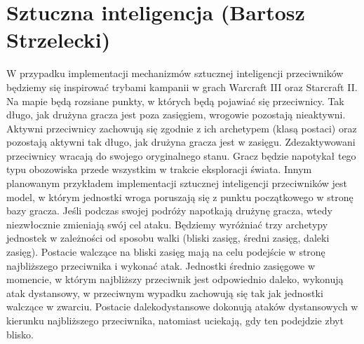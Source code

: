 \section{Sztuczna inteligencja (Bartosz Strzelecki)}

W przypadku implementacji mechanizmów sztucznej inteligencji przeciwników będziemy się inspirować trybami kampanii w grach Warcraft III oraz Starcraft II. 
Na mapie będą rozsiane punkty, w których będą pojawiać się przeciwnicy. 
Tak długo, jak drużyna gracza jest poza zasięgiem, wrogowie pozostają nieaktywni. 
Aktywni przeciwnicy zachowują się zgodnie z ich archetypem (klasą postaci) oraz pozostają aktywni tak długo, jak drużyna gracza jest w zasięgu. 
Zdezaktywowani przeciwnicy wracają do swojego oryginalnego stanu. Gracz będzie napotykał tego typu obozowiska przede wszystkim w trakcie eksploracji świata. 
Innym planowanym przykładem implementacji sztucznej inteligencji przeciwników jest model, w którym jednostki wroga poruszają się z punktu początkowego w stronę bazy gracza. 
Jeśli podczas swojej podróży napotkają drużynę gracza, wtedy niezwłocznie zmieniają swój cel ataku.
Będziemy wyróżniać trzy archetypy jednostek w zależności od sposobu walki (bliski zasięg, średni zasięg, daleki zasięg). 
Postacie walczące na bliski zasięg mają na celu podejście w stronę najbliższego przeciwnika i wykonać atak. 
Jednostki średnio zasięgowe w momencie, w którym najbliższy przeciwnik jest odpowiednio daleko, wykonują atak dystansowy, 
w przeciwnym wypadku zachowują się tak jak jednostki walczące w zwarciu. 
Postacie  dalekodystansowe dokonują ataków dystansowych w kierunku najbliższego przeciwnika, natomiast uciekają, gdy ten podejdzie zbyt blisko.


